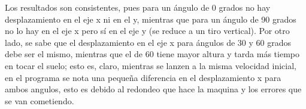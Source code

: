 \documentclass[notitlepage,12pt]{article}
\begin{document}
Los resultados son consistentes, pues para un \'angulo de 0 grados no hay desplazamiento
en el eje x ni en el y, mientras que para un \'angulo de 90 grados no lo hay en el eje x
pero s\'i en el eje y (se reduce a un tiro vertical). Por otro lado, se sabe que el
desplazamiento en el eje x para \'angulos de 30 y 60 grados debe ser el mismo, mientras
que el de 60 tiene mayor altura y tarda m\'as tiempo en tocar el suelo; esto es, claro,
mientras se lanzen a la misma velocidad inicial, en el programa se nota una pequeña diferencia
en el desplazamiento x para ambos angulos, esto es debido al redondeo que hace la maquina y los
errores que se van cometiendo.
\end{document}
